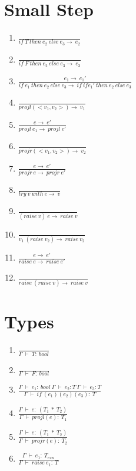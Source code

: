 \documentclass{article}
\begin{document}
\section{Small Step}
\begin{enumerate}
\item $\frac{}{if \ T \ then \ e_2 \ else \ e_3 \rightarrow \ e_2}$
\item $\frac{}{if \ F \ then \ e_2 \ else \ e_3 \rightarrow \ e_3}$
\item $\frac{e_1 \rightarrow \ e_1'}{if \ e_1 \ then \ e_2 \ else \ e_3 \rightarrow \ if \ if e_1' \ then \ e_2 \ else \ e_3}$
\item $\frac{}{projl(<v_1 , v_2>) \rightarrow \ v_1}$
\item $\frac{e \rightarrow \ e'}{projl \ e_1 \rightarrow \ projl \ e'}$
\item $\frac{}{projr(<v_1 , v_2>) \rightarrow \ v_2}$
\item $\frac{e \rightarrow \ e'}{projr \ e \rightarrow \ projr \ e'}$
\item $\frac{}{try \ v \ with \ e \rightarrow \ v}$
\item $\frac{}{(raise \ v) \ e \rightarrow \ raise \ v }$
\item $\frac{}{v_1 \ (raise \ v_2) \rightarrow \ raise \ v_2}$
\item $\frac{e \rightarrow \ e'}{raise \ e \rightarrow \ raise \ e'}$
\item $\frac{}{raise \ (raise \ v) \rightarrow \ raise \ v}$
\end{enumerate}

\section{Types}
\begin{enumerate}
\item $\frac{}{\Gamma \ \vdash \ T: \ bool}$
\item $\frac{}{\Gamma \ \vdash \ F: \ bool}$
\item $\frac{\Gamma \ \vdash \ e_1: \ bool \ \Gamma \ \vdash \ e_2:T \ \Gamma \ \vdash \ e_3: T}{\Gamma \ \vdash \ if \ (e_1)(e_2)(e_3): \ T}$
\item $\frac{\Gamma \ \vdash \ e: \ (T_1 \ * \ T_2)}{\Gamma \ \vdash \ projl(e): \ T_1}$
\item $\frac{\Gamma \ \vdash \ e: \ (T_1 \ * \ T_2)}{\Gamma \ \vdash \ projr(e): \ T_2}$
\item $\frac{\Gamma \ \vdash \ e_1: \ T_{exn}}{\Gamma \ \vdash \ raise \ e_1: \ T}$
\end{enumerate}
 
\end{document}
